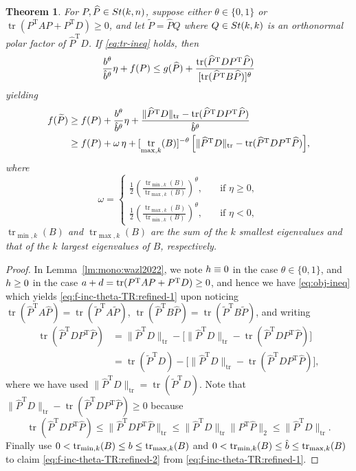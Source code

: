 \documentclass[11pt]{article}
\def\wtd{\widetilde}
\def\what{\widehat}
\newcommand\STM[2]{{\rm St}(#1,#2)}
\DeclareMathOperator{\tr}{tr}
\DeclareMathOperator{\T}{T}
\newtheorem{theorem}{Theorem}[section]
\theoremstyle{definition}
\numberwithin{equation}{section}
\begin{document}
\begin{theorem}\label{thm:mono:wazl2022}
For $P,\what P\in\STM{k}{n}$, suppose either $\theta\in\{0,1\}$ or $\tr (P^{\T}AP+P^{\T}D)\ge 0$, and let
$\wtd P=\what PQ$ where $Q\in\STM{k}{k}$ is an orthonormal polar factor of $\what P^{\T} D$.
If \eqref{eq:tr-ineq} holds, then
\begin{equation}\label{eq:obj-ineq}
\frac {\newbeta^{\theta}}{\hat\newbeta^{\theta}}\eta+f(P)
    \le g(\what P)+\frac {\tr(\what P^{\T} DP^{\T}\what P)}{[\tr(\what P^{\T} B\what P)]^{\theta}}
\end{equation}
yielding
\begin{align}
f(\wtd P)&\ge f(P)+\frac {\newbeta^{\theta}}{\hat\newbeta^{\theta}}\eta+
    \frac {\|\what P^{\T} D\|_{\tr}-\tr(\what P^{\T} DP^{\T}\what P)}{\hat\newbeta^{\theta}} \label{eq:f-inc-theta-TR:refined-1}\\
      &\ge f(P)+\omega\,\eta
       +[\tr_{\max,k}(B)]^{-\theta}\,\Big[\|\what P^{\T}D\|_{\tr}-\tr(\what P^{\T}DP^{\T}\what P)\Big], \label{eq:f-inc-theta-TR:refined-2}
\end{align}
where
$$
\omega=
\begin{cases}
\frac 12\left(\frac {\tr_{\min,k}(B)}{\tr_{\max,k}(B)}\right)^{\theta},\quad&\mbox{if $\eta\ge 0$}, \\
\frac 12\left(\frac {\tr_{\max,k}(B)}{\tr_{\min,k}(B)}\right)^{\theta},\quad&\mbox{if $\eta< 0$},
\end{cases}
$$
$\tr_{\min,k}(B)$ and $\tr_{\max,k}(B)$ are the sum of the $k$ smallest eigenvalues and that of the $k$ largest eigenvalues of $B$, respectively.
\end{theorem}

\begin{proof}
In Lemma~\ref{lm:mono:wazl2022}, we note $h\equiv 0$
in the case $\theta\in\{0,1\}$, and $h\ge 0$ in the case $\newalpha+\newdelta=\tr (P^{\T}AP+P^{\T}D)\ge 0$,
and hence we have \eqref{eq:obj-ineq} which yields \eqref{eq:f-inc-theta-TR:refined-1} upon noticing
$\tr (\what P^{\T} A\what P)=\tr (\wtd P^{\T} A\wtd P)$,
$\tr (\what P^{\T} B\what P)=\tr (\wtd P^{\T} B\wtd P)$, and writing
\begin{align*}
\tr(\what P^{\T} DP^{\T}\what P)&=\|\what P^{\T} D\|_{\tr}-\Big[\|\what P^{\T}D\|_{\tr}-\tr(\what P^{\T}DP^{\T}\what P)\Big] \\
   &=\tr(\wtd P^{\T} D)-\Big[\|\what P^{\T}D\|_{\tr}-\tr(\what P^{\T}DP^{\T}\what P)\Big],
\end{align*}
where we have used $\|\what P^{\T} D\|_{\tr}=\tr(\wtd P^{\T} D)$.
Note that $\|\what P^{\T}D\|_{\tr}-\tr(\what P^{\T}DP^{\T}\what P)\ge 0$ because
$$
\tr(\what P^{\T} DP^{\T}\what P)
  \le \|\what P^{\T} DP^{\T}\what P\|_{\tr}
  \le \|\what P^{\T} D\|_{\tr}\|P^{\T}\what P\|_2
  \le \|\what P^{\T} D\|_{\tr}.
$$
Finally use $0<\tr_{\min,k}(B)\le\newbeta\le \tr_{\max,k}(B)$
and $0<\tr_{\min,k}(B)\le\hat\newbeta\le \tr_{\max,k}(B)$ to claim \eqref{eq:f-inc-theta-TR:refined-2} from
\eqref{eq:f-inc-theta-TR:refined-1}.
\end{proof}
\end{document}
